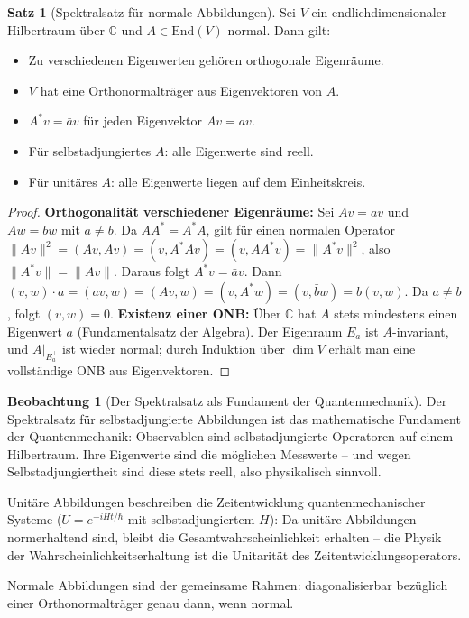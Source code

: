 ﻿\documentclass[a4paper,12pt]{report}
\theoremstyle{definition}
\newtheorem{satz}{Satz}
\newtheorem{beobachtung}{Beobachtung}
\begin{document}
\begin{satz}[Spektralsatz für normale Abbildungen]
    Sei $V$ ein endlichdimensionaler Hilbertraum über $\mathbb{C}$ und
    $A \in \mathrm{End}(V)$ normal. Dann gilt:
    \begin{itemize}
        \item[-] Zu verschiedenen Eigenwerten gehören orthogonale Eigenräume.
        \item[-] $V$ hat eine Orthonormalträger aus Eigenvektoren von $A$.
        \item[-] $A^*v = \bar{a}v$ für jeden Eigenvektor $Av = av$.
        \item[-] Für selbstadjungiertes $A$: alle Eigenwerte sind reell.
        \item[-] Für unitäres $A$: alle Eigenwerte liegen auf dem Einheitskreis.
    \end{itemize}
\end{satz}
\begin{proof}
    \textbf{Orthogonalität verschiedener Eigenräume:} Sei $Av = av$ und $Aw = bw$
    mit $a \neq b$. Da $AA^* = A^*A$, gilt für einen normalen Operator
    $\|Av\|^2 = (Av, Av) = (v, A^*Av) = (v, AA^*v) = \|A^*v\|^2$,
    also $\|A^*v\| = \|Av\|$. Daraus folgt $A^*v = \bar{a}v$.
    Dann $(v, w) \cdot a = (av, w) = (Av, w) = (v, A^*w) = (v, \bar{b}w) = b(v,w)$.
    Da $a \neq b$, folgt $(v, w) = 0$.
    \textbf{Existenz einer ONB:} Über $\mathbb{C}$ hat $A$ stets mindestens
    einen Eigenwert $a$ (Fundamentalsatz der Algebra). Der Eigenraum $E_a$ ist
    $A$-invariant, und $A|_{E_a^\perp}$ ist wieder normal; durch Induktion
    über $\dim V$ erhält man eine vollständige ONB aus Eigenvektoren.
\end{proof}


\begin{beobachtung}[Der Spektralsatz als Fundament der Quantenmechanik]
    Der Spektralsatz für selbstadjungierte Abbildungen ist das mathematische
    Fundament der Quantenmechanik: Observablen sind selbstadjungierte
    Operatoren auf einem Hilbertraum. Ihre Eigenwerte sind die möglichen
    Messwerte -- und wegen Selbstadjungiertheit sind diese stets reell,
    also physikalisch sinnvoll.

    Unitäre Abbildungen beschreiben die Zeitentwicklung quantenmechanischer
    Systeme ($U = e^{-iHt/\hbar}$ mit selbstadjungiertem $H$): Da
    unitäre Abbildungen normerhaltend sind, bleibt die
    Gesamtwahrscheinlichkeit erhalten -- die Physik der Wahrscheinlichkeitserhaltung
    ist die Unitarität des Zeitentwicklungsoperators.

    Normale Abbildungen sind der gemeinsame Rahmen: diagonalisierbar
    bezüglich einer Orthonormalträger genau dann, wenn normal.
\end{beobachtung}
\end{document}
